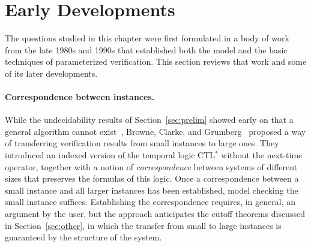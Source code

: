 \section{Early Developments}
\label{sec:early}

The questions studied in this chapter were first formulated in a body of work
from the late 1980s and 1990s that established both the model and the basic
techniques of parameterized verification. This section reviews that work and
some of its later developments.

\paragraph{Correspondence between instances.}
While the undecidability results of Section~\ref{sec:prelim} showed early on
that a general algorithm cannot exist~\cite{AK86,Suz88}, Browne, Clarke, and
Grumberg~\cite{BCG89} proposed a way of transferring
verification results from small instances to large ones. They introduced an
indexed version of the temporal logic CTL$^*$ without the next-time operator,
together with a notion of \emph{correspondence} between systems of different
sizes that preserves the formulas of this logic. Once a correspondence between
a small instance and all larger instances has been established, model checking
the small instance suffices. Establishing the correspondence requires, in
general, an argument by the user, but the approach anticipates the cutoff
theorems discussed in Section~\ref{sec:other}, in which the transfer from small to large
instances is guaranteed by the structure of the system.

